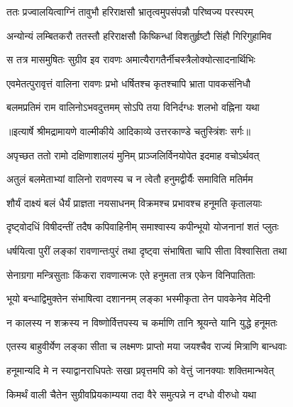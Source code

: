 \twolineshloka
{ततः प्रज्वालयित्वाग्निं तावुभौ हरिराक्षसौ}
{भ्रातृत्वमुपसंपन्नौ परिष्वज्य परस्परम्} %

\twolineshloka
{अन्योन्यं लम्बितकरौ ततस्तौ हरिराक्षसौ}
{किष्किन्धां विशतुर्हृष्टौ सिंहौ गिरिगुहामिव} %

\twolineshloka
{स तत्र मासमुषितः सुग्रीव इव रावणः}
{अमात्यैरागतैर्नीचस्त्रैलोक्योत्सादनार्थिभिः} %

\twolineshloka
{एवमेतत्पुरावृत्तं वालिना रावणः प्रभो}
{धर्षितश्च कृतश्चापि भ्राता पावकसंनिधौ} %

\twolineshloka
{बलमप्रतिमं राम वालिनोऽभवदुत्तमम्}
{सोऽपि तया विनिर्दग्धः शलभो वह्निना यथा} %


{॥इत्यार्षे श्रीमद्रामायणे वाल्मीकीये आदिकाव्ये उत्तरकाण्डे चतुस्त्रिंशः सर्गः॥}


\twolineshloka
{अपृच्छत ततो रामो दक्षिणाशालयं मुनिम्}
{प्राञ्जलिर्विनयोपेत इदमाह वचोऽर्थवत्} %

\twolineshloka
{अतुलं बलमेताभ्यां वालिनो रावणस्य च}
{न त्वेतौ हनुमद्वीर्यैः समाविति मतिर्मम} %

\twolineshloka
{शौर्यं दाक्ष्यं बलं धैर्यं प्राज्ञता नयसाधनम्}
{विक्रमश्च प्रभावश्च हनूमति कृतालयाः} %

\twolineshloka
{दृष्ट्वोदधिं विषीदन्तीं तदैष कपिवाहिनीम्}
{समाश्वास्य कपीन्भूयो योजनानां शतं प्लुतः} %

\twolineshloka
{धर्षयित्वा पुरीं लङ्कां रावणान्तःपुरं तथा}
{दृष्ट्वा संभाषिता चापि सीता विश्वासिता तथा} %

\twolineshloka
{सेनाग्रगा मन्त्रिसुताः किंकरा रावणात्मजः}
{एते हनुमता तत्र एकेन विनिपातिताः} %

\twolineshloka
{भूयो बन्धाद्विमुक्तेन संभाषित्वा दशाननम्}
{लङ्का भस्मीकृता तेन पावकेनेव मेदिनी} %

\twolineshloka
{न कालस्य न शक्रस्य न विष्णोर्वित्तपस्य च}
{कर्माणि तानि श्रूयन्ते यानि युद्धे हनूमतः} %

\twolineshloka
{एतस्य बाहुवीर्येण लङ्का सीता च लक्ष्मणः}
{प्राप्तो मया जयश्चैव राज्यं मित्राणि बान्धवाः} %

\twolineshloka
{हनूमान्यदि मे न स्याद्वानराधिपतेः सखा}
{प्रवृत्तमपि को वेत्तुं जानक्याः शक्तिमान्भवेत्} %

\twolineshloka
{किमर्थं वाली चैतेन सुग्रीवप्रियकाम्यया}
{तदा वैरे समुत्पन्ने न दग्धो वीरुधो यथा} %

